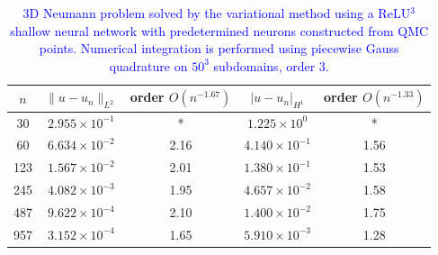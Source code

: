 \documentclass{article}
\theoremstyle{remark}
\begin{document}


\begin{table}[H]
    \centering
    {\color{blue}
    \begin{tabular}{c|c|c|c|c}
    $n$ & $\|u-u_n\|_{L^2}$ & order $O(n^{-1.67})$ & $|u-u_n|_{H^1}$ & order $O(n^{-1.33})$ \\ \hline \hline
    30  & $2.955\times10^{-1}$ & *    & $1.225\times10^{0}$ & *    \\ \hline
    60  & $6.634\times10^{-2}$ & 2.16 & $4.140\times10^{-1}$ & 1.56 \\ \hline
    123 & $1.567\times10^{-2}$ & 2.01 & $1.380\times10^{-1}$ & 1.53 \\ \hline
    245 & $4.082\times10^{-3}$ & 1.95 & $4.657\times10^{-2}$ & 1.58 \\ \hline
    487 & $9.622\times10^{-4}$ & 2.10 & $1.400\times10^{-2}$ & 1.75 \\ \hline
    957 & $3.152\times10^{-4}$ & 1.65 & $5.910\times10^{-3}$ & 1.28 \\ \hline
    \end{tabular}
    \caption{\textcolor{blue}{3D Neumann problem solved by the variational method using a ReLU$^3$ shallow neural network with predetermined neurons constructed from QMC points. Numerical integration is performed using piecewise Gauss quadrature on $50^3$ subdomains, order 3.}}
    \label{tab:Neuman-RFM-ex1-3d-qmc}
    }
\end{table}
\end{document}
